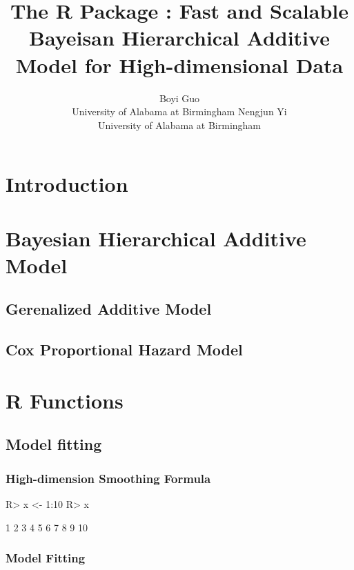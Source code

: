 \documentclass[
]{jss}
\author{
Boyi Guo\\University of Alabama at Birmingham \And Nengjun
Yi\\University of Alabama at Birmingham
}
\title{The R Package \pkg{BHAM}: Fast and Scalable Bayeisan Hierarchical
Additive Model for High-dimensional Data}
\begin{document}
\hypertarget{introduction}{%
\section{Introduction}\label{introduction}}

\hypertarget{bayesian-hierarchical-additive-model}{%
\section{Bayesian Hierarchical Additive
Model}\label{bayesian-hierarchical-additive-model}}

\hypertarget{gerenalized-additive-model}{%
\subsection{Gerenalized Additive
Model}\label{gerenalized-additive-model}}

\hypertarget{cox-proportional-hazard-model}{%
\subsection{Cox Proportional Hazard
Model}\label{cox-proportional-hazard-model}}

\hypertarget{r-functions}{%
\section{R Functions}\label{r-functions}}

\hypertarget{model-fitting}{%
\subsection{Model fitting}\label{model-fitting}}

\hypertarget{high-dimension-smoothing-formula}{%
\subsubsection{High-dimension Smoothing
Formula}\label{high-dimension-smoothing-formula}}

\begin{CodeChunk}
\begin{CodeInput}
R> x <- 1:10
R> x
\end{CodeInput}
\begin{CodeOutput}
 [1]  1  2  3  4  5  6  7  8  9 10
\end{CodeOutput}
\end{CodeChunk}

\hypertarget{model-fitting-1}{%
\subsubsection{Model Fitting}\label{model-fitting-1}}
\end{document}
